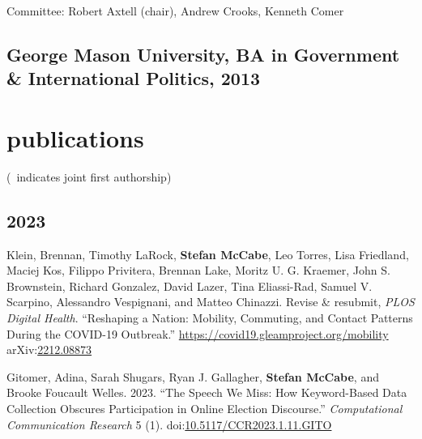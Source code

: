 \documentclass[11pt, letter]{article}
\begin{document}
Committee: Robert Axtell (chair), Andrew Crooks, Kenneth Comer
\subsection{George Mason University, BA in Government \& International Politics,
  2013}

\vspace{2mm}

\section{publications}
\vspace{1mm} {\footnotesize (\textdagger\, indicates joint first authorship)}
\subsection*{} %

\subsection{2023}
\begin{hangparas}{.25in}{1}
Klein, Brennan,\textsuperscript{\textdagger} Timothy LaRock,\textsuperscript{\textdagger} \textbf{Stefan McCabe},\textsuperscript{\textdagger} Leo Torres,\textsuperscript{\textdagger} Lisa Friedland, Maciej Kos, Filippo Privitera, Brennan Lake, Moritz U. G. Kraemer, John S. Brownstein, Richard Gonzalez, David Lazer, Tina Eliassi-Rad, Samuel V. Scarpino, Alessandro Vespignani, and Matteo Chinazzi. Revise \& resubmit, \textit{PLOS Digital Health}. ``Reshaping a Nation: Mobility, Commuting, and Contact Patterns During the COVID-19 Outbreak.'' \href{https://covid19.gleamproject.org/mobility}{https://covid19.gleamproject.org/mobility} arXiv:\href{https://arxiv.org/abs/2212.08873}{2212.08873}\vspace{2mm}

Gitomer, Adina, Sarah Shugars, Ryan J. Gallagher, \textbf{Stefan McCabe}, and Brooke Foucault Welles. 2023. ``The Speech We Miss: How Keyword-Based Data Collection Obscures Participation in Online Election Discourse.''  \textit{Computational Communication Research} 5 (1). doi:\href{https://doi.org/10.5117/CCR2023.1.11.GITO}{10.5117/CCR2023.1.11.GITO}\vspace{2mm}
\end{hangparas}
\end{document}
